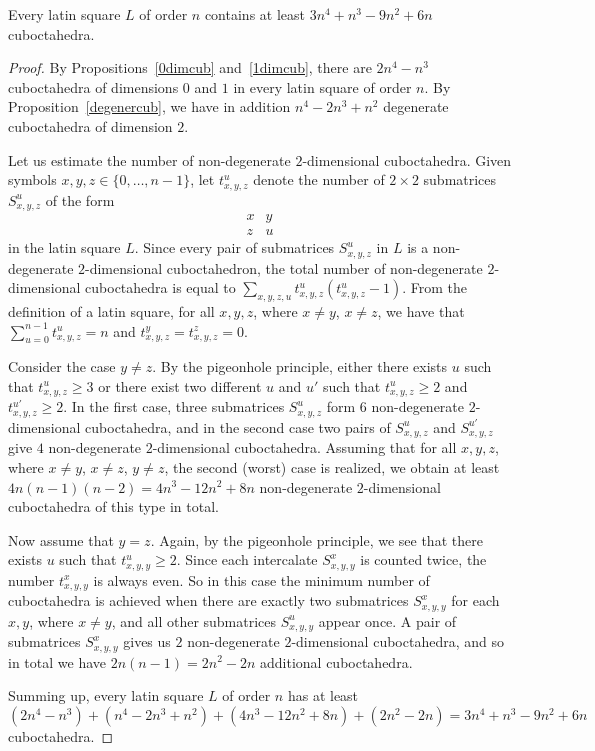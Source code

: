 \documentclass[a4paper]{article}
\begin{document}
\begin{theorem} \label{lowboundsquare}
Every latin square  $L$ of order $n$ contains at least $3 n^4 + n^3 - 9 n^2 + 6n$ cuboctahedra. 
\end{theorem}


\begin{proof}
By Propositions~\ref{0dimcub} and~\ref{1dimcub}, there are $2n^4 - n^3$ cuboctahedra of dimensions $0$ and $1$  in every latin square of order $n$.  By Proposition~\ref{degenercub}, we have in addition $n^4 - 2n^3 + n^2$ degenerate cuboctahedra of dimension $2$. 

Let us estimate the number of non-degenerate $2$-dimensional cuboctahedra. 
Given symbols $x,y,z \in \{ 0, \ldots, n-1\}$,  let  $t^u_{x,y,z}$ denote the number  of $2 \times 2$ submatrices $S^u_{x,y,z}$ of the form
$$
\begin{array}{cc}
 x & y \\ 
 z & u
\end{array}
$$
 in the latin square $L$.   Since every pair of submatrices  $S^u_{x,y,z}$  in $L$ is a non-degenerate $2$-dimensional cuboctahedron, the total number of non-degenerate $2$-dimensional cuboctahedra is  equal to $\sum\limits_{x,y,z,u} t^u_{x,y,z} (t^u_{x,y,z} - 1) $. 
 From the definition of a latin square,  for all $x,y,z$, where  $x \neq y$, $x \neq z$, we have  that $\sum\limits_{u=0}^{n-1} t^u_{x,y,z} = n $ and  $ t^y_{x,y,z} =  t^z_{x,y,z} = 0$.
 
Consider the case $y \neq z$. By the pigeonhole principle, either  there exists $u$ such that $ t^u_{x,y,z}  \geq 3 $ or there exist two different $u$ and $u'$ such that $ t^u_{x,y,z}  \geq 2$ and $ t^{u'}_{x,y,z}  \geq 2$. In the first case, three submatrices $S^u_{x,y,z}$  form $6$  non-degenerate $2$-dimensional cuboctahedra, and in the second case two pairs of $S^u_{x,y,z}$ and $S^{u'}_{x,y,z}$ give  $4$  non-degenerate $2$-dimensional cuboctahedra. Assuming that for all  $x,y,z$, where $x \neq y$, $x \neq z$, $y \neq z$, the second  (worst) case is realized, we obtain at least $4 n (n-1) (n-2) = 4 n^3 - 12n^2 + 8n$  non-degenerate $2$-dimensional  cuboctahedra  of this type in total. 
 
Now assume that $y = z$. Again, by the pigeonhole principle, we see that  there exists $u$ such that $ t^u_{x,y,y}  \geq 2 $.  Since each intercalate $S^x_{x,y,y}$ is counted twice, the number $t^x_{x,y,y}$ is always even.  So in this case the minimum number of cuboctahedra is achieved when there are exactly two submatrices  $S^x_{x,y,y}$  for each $x,y$, where $x \neq y$, and all other submatrices  $S^u_{x,y,y}$ appear once. A pair of submatrices  $S^x_{x,y,y}$   gives us $2$ non-degenerate $2$-dimensional cuboctahedra, and so in total we have $2 n (n-1) = 2n^2 - 2n$ additional cuboctahedra. 
 
 Summing up, every latin square $L$ of order $n$ has at least
 $$(2n^4 - n^3) + (n^4 - 2n^3 + n^2) + (4 n^3 - 12n^2 + 8n) + (2n^2 - 2n) = 3n^4 + n^3 - 9 n^2 + 6n$$
 cuboctahedra. 
 

\end{proof}
\end{document}
